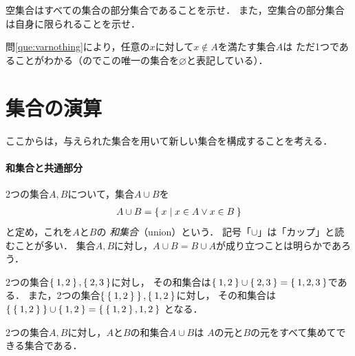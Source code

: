     
   \begin{que} \label{que:varnothing}
     空集合はすべての集合の部分集合であることを示せ．
     また，空集合の部分集合は自身に限られることを示せ．
   \end{que}

   問\ref{que:varnothing}により，任意の$x$に対して$x \notin A$を満たす集合$A$は
   ただ1つであることがわかる（のでこの唯一の集合を$\varnothing$と表記している）．
  



 \section{集合の演算}
 \label{sec:enzan}

   ここからは，与えられた集合を用いて新しい集合を構成することを考える．

  \paragraph{和集合と共通部分}
   2つの集合$A,  B$について，集合$A \cup B$を
   \begin{align}
     A \cup B = \Set{ x \mid  x \in A \lor x \in B}
     \label{eq:union}
   \end{align}
   と定め，これを$A$と$B$の
   \emph{和集合}（union）という．
   記号「$\cup$」は「カップ」と読むことが多い．
   集合$A,  B$に対し，$A \cup B = B \cup A$が成り立つことは明らかであろう．
   
   \begin{ex} \label{ex:union}
     2つの集合$\Set{ 1,  2},  \Set{ 2,  3}$に対し，
     その和集合は$\Set{ 1,  2} \cup \Set{ 2,  3} = \Set{1,  2,  3}$である．
     また，2つの集合$\Set{\Set{1,  2}} ,  \Set{ 1,  2}$に対し，
     その和集合は
     $\Set{\Set{1,  2}} \cup \Set{1,  2} = \Set{ \Set{1,  2},  1,  2}$
     となる．
   \end{ex}
   
   2つの集合$A,  B$に対し，$A$と$B$の和集合$A \cup B$は
   $A$の元と$B$の元をすべて集めてできる集合である．
   
